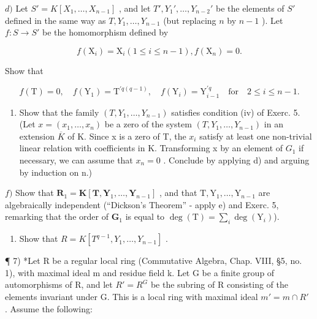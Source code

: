 \(d)\) Let \(S' = K[X_1, \ldots, X_{n-1}]\) , and let \(T', Y_1', \ldots, Y_{n-2}'\) be the elements of \(S'\) defined in the same way as \(T, Y_1, \ldots, Y_{n-1}\) (but replacing \(n\) by \(n-1\) ). Let \(f: S \to S'\) be the homomorphism defined by

\[
f \left(\mathrm{X} _ {i}\right) = \mathrm{X} _ {i} (1 \leqslant i \leqslant n - 1), f \left(\mathrm{X} _ {n}\right) = 0.
\]

Show that

\[
f (\mathrm{T}) = 0, \quad f (\mathrm{Y} _ {1}) = \mathrm{T} ^ {\prime q (q - 1)}, \quad f (\mathrm{Y} _ {i}) = \mathrm{Y} _ {i - 1} ^ {\prime q} \quad \text{for} \quad 2 \leqslant i \leqslant n - 1.
\]

\begin{enumerate}
\def\labelenumi{\alph{enumi})}
\setcounter{enumi}{4}
\tightlist
\item
  Show that the family \((T, Y_{1}, \ldots, Y_{n-1})\) satisfies condition (iv) of Exerc. 5. (Let \(x = (x_{1}, \ldots, x_{n})\) be a zero of the system \((T, Y_{1}, \ldots, Y_{n-1})\) in an extension \(\overline{K}\) of K. Since x is a zero of T, the \(x_{i}\) satisfy at least one non-trivial linear relation with coefficients in K. Transforming x by an element of \(G_{1}\) if necessary, we can assume that \(x_{n} = 0\) . Conclude by applying d) and arguing by induction on n.)
\end{enumerate}

\(f)\) Show that \(\mathbf{R}_1 = \mathbf{K}[\mathbf{T},\mathbf{Y}_1,\dots ,\mathbf{Y}_{n - 1}]\) , and that \(\mathrm{T},\mathrm{Y}_1,\dots ,\mathrm{Y}_{n - 1}\) are algebraically independent (``Dickson's Theorem'' - apply e) and Exerc. 5, remarking that the order of \(\mathbf{G}_1\) is equal to \(\deg (\mathrm{T}) = \sum_{i}\deg (\mathrm{Y}_i)\)).

\begin{enumerate}
\def\labelenumi{\alph{enumi})}
\setcounter{enumi}{6}
\tightlist
\item
  Show that \(R = K[T^{q-1}, Y_{1}, \ldots, Y_{n-1}]\) .
\end{enumerate}

¶ 7) *Let R be a regular local ring (Commutative Algebra, Chap. VIII, §5, no. 1), with maximal ideal m and residue field k. Let G be a finite group of automorphisms of R, and let \(R' = R^{G}\) be the subring of R consisting of the elements invariant under G. This is a local ring with maximal ideal \(m' = m \cap R'\) . Assume the following:

